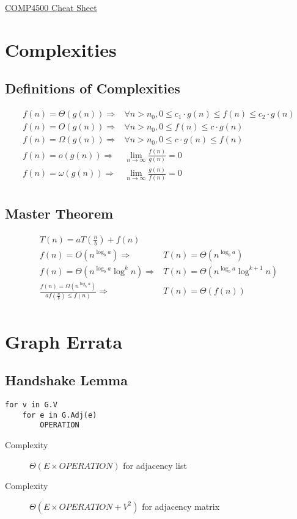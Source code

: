 \documentclass[landscape]{cheat}
\begin{document}
\footnotesize
\begin{multicols*}{3}

\begin{center}
\Large{\underline{COMP4500 Cheat Sheet}} \\
\end{center}

\section{Complexities}

\subsection{Definitions of Complexities}
\begin{align*}
    f(n) = \Theta(g(n)) \Rightarrow& \forall n > n_0, 0 \leq c_1 \cdot g(n) \leq f(n) \leq c_2 \cdot g(n) \\
    f(n) = O(g(n)) \Rightarrow& \forall n > n_0, 0 \leq f(n) \leq c \cdot g(n) \\
    f(n) = \Omega(g(n)) \Rightarrow& \forall n > n_0, 0 \leq c \cdot g(n) \leq f(n) \\
    f(n) = o(g(n)) \Rightarrow& \lim_{n \rightarrow \infty} \frac {f(n)} {g(n)} = 0 \\
    f(n) = \omega(g(n)) \Rightarrow& \lim_{n \rightarrow \infty} \frac {g(n)} {f(n)} = 0 \\
\end{align*}

\subsection{Master Theorem}
\begin{align*}
    T(n) = a T\left(\frac n b\right) + f(n) \\
    f(n) = O(n^{\log_b a}) \Rightarrow& T(n) =\Theta(n^{\log_b a}) \\
    f(n) = \Theta(n^{\log_b a} \log^k n) \Rightarrow& T(n) = \Theta(n^{\log_b a} \log^{k+1} n) \\
    \frac {f(n) = \Omega(n^{\log_b a})} {af(\frac n b) \leq f(n)} \Rightarrow& T(n) = \Theta(f(n)) \\
\end{align*}

\section{Graph Errata}
\subsection{Handshake Lemma}
\begin{lstlisting}
for v in G.V
    for e in G.Adj(e)
        OPERATION
\end{lstlisting}
\begin{description}
    \item[Complexity] $\Theta(E \times OPERATION)$ for adjacency list
    \item[Complexity] $\Theta(E \times OPERATION + V^2)$ for adjacency matrix
\end{description}


\end{multicols*}
\end{document}
